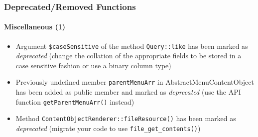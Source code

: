 \begin{frame}[fragile]
	\frametitle{Deprecated/Removed Functions}
	\framesubtitle{Miscellaneous (1)}


	\begin{itemize}

		\item Argument \texttt{\$caseSensitive} of the method \texttt{Query::like}
			has been marked as \textit{deprecated}\newline
			\smaller
				(change the collation of the appropriate fields to be stored in a case sensitive fashion
				or use a binary column type)
			\normalsize

		\item Previously undefined member \texttt{parentMenuArr} in AbstractMenuContentObject
			has been added as public member and marked as \textit{deprecated}\newline
			\smaller
				(use the API function \texttt{getParentMenuArr()} instead)
			\normalsize

		\item Method \texttt{ContentObjectRenderer::fileResource()}
			has been marked as \textit{deprecated}\newline
			\smaller
				(migrate your code to use \texttt{file\_get\_contents()})
			\normalsize

	\end{itemize}

\end{frame}





